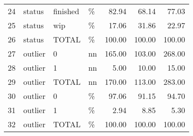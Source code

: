 \begin{sidewaystable}[ht]
\begin{tabular}{rlllrrr}
  24 & status & finished & \% & 82.94 & 68.14 & 77.03 \\ 
  25 & status & wip & \% & 17.06 & 31.86 & 22.97 \\ 
  26 & status & TOTAL & \% & 100.00 & 100.00 & 100.00 \\ 
  27 & outlier & 0 & nn & 165.00 & 103.00 & 268.00 \\ 
  28 & outlier & 1 & nn & 5.00 & 10.00 & 15.00 \\ 
  29 & outlier & TOTAL & nn & 170.00 & 113.00 & 283.00 \\ 
  30 & outlier & 0 & \% & 97.06 & 91.15 & 94.70 \\ 
  31 & outlier & 1 & \% & 2.94 & 8.85 & 5.30 \\ 
  32 & outlier & TOTAL & \% & 100.00 & 100.00 & 100.00 \\ 
   \hline
\end{tabular}
\end{sidewaystable}
